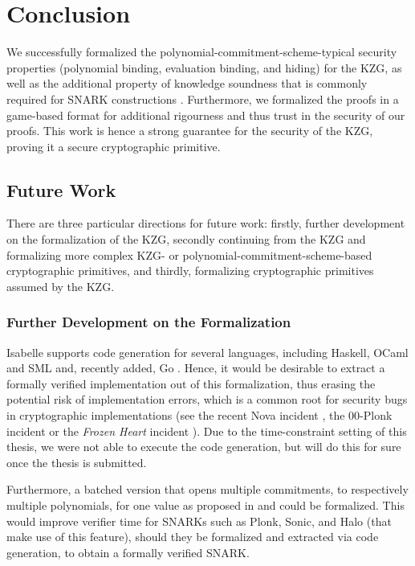 \chapter{Conclusion}\label{chapter:conclusion}
We successfully formalized the polynomial-commitment-scheme-typical security properties (polynomial binding, evaluation binding, and hiding) for the KZG, as well as the additional property of knowledge soundness that is commonly required for SNARK constructions \parencite{thalerbook,plonk,sonic,halo}. Furthermore, we formalized the proofs in a game-based format for additional rigourness and thus trust in the security of our proofs.
This work is hence a strong guarantee for the security of the KZG, proving it a secure cryptographic primitive.

\section*{Future Work}
There are three particular directions for future work: firstly, further development on the formalization of the KZG, secondly continuing from the KZG and formalizing more complex KZG- or polynomial-commitment-scheme-based cryptographic primitives, and thirdly, formalizing cryptographic primitives assumed by the KZG.

\subsection*{Further Development on the Formalization}
Isabelle supports code generation for several languages, including Haskell, OCaml and SML \parencite{code_gen} and, recently added, Go \parencite{go_codegen}. Hence, it would be desirable to extract a formally verified implementation out of this formalization, thus erasing the potential risk of implementation errors, which is a common root for security bugs in cryptographic implementations (see the recent Nova incident \parencite{nova_bug}, the 00-Plonk incident \parencite{00Plonk} or the \textit{Frozen Heart} incident \parencite{FHPlonk}). Due to the time-constraint setting of this thesis, we were not able to execute the code generation, but will do this for sure once the thesis is submitted.

Furthermore, a batched version that opens multiple commitments, to respectively multiple polynomials, for one value as proposed in \parencite{plonk} and \parencite{sonic} could be formalized. This would improve verifier time for SNARKs such as Plonk, Sonic, and Halo (that make use of this feature), should they be formalized and extracted via code generation, to obtain a formally verified SNARK.

